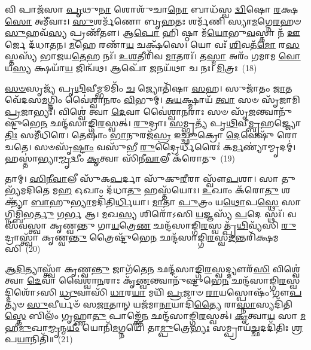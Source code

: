 {\anuvakamend[{\-\ul{𑌸𑍁}\-\-\ul{𑌶}\-𑌸𑍍𑌤𑌿𑌭𑌿𑌃᳴ \ul{𑌶𑌿}\-𑌵𑍋 𑌭᳴𑌵 𑌯𑌾\-\ul{𑌹𑌿} 𑌷𑌟𑍍𑌤𑍍𑌰𑌿𑍞᳴𑌶𑌚𑍍𑌚}]}%

𑌵𑌿 𑌪𑌾𑌜᳴𑌸𑌾 \ul{𑌪𑍃}\-𑌥𑍁\-\ul{𑌨𑌾} 𑌶𑍋𑌶𑍁᳴𑌚𑌾\-\ul{𑌨𑍋} 𑌬𑌾𑌧᳴𑌸𑍍𑌵 \ul{𑌦𑍍𑌵𑌿}\-𑌷𑍋 \ul{𑌰}\-𑌕𑍍𑌷\-\ul{𑌸𑍋} 𑌅𑌮𑍀᳴𑌵𑌾𑌃। \ul{𑌸𑍁}\-𑌶𑌰𑍍𑌮᳴𑌣𑍋 𑌬𑍃\-\ul{𑌹}\-𑌤𑌃 𑌶𑌰𑍍𑌮᳴𑌣𑌿 𑌸𑍍𑌯𑌾\-\ul{𑌮}\-𑌗𑍍𑌨𑍇\-\ul{𑌰}\-𑌹𑍞 \ul{𑌸𑍁}\-𑌹𑌵᳴\-\ul{𑌸𑍍𑌯} 𑌪𑍍𑌰𑌣𑍀᳴𑌤𑍗। 𑌆\-\ul{𑌪𑍋} 𑌹𑌿 𑌷𑍍𑌠𑌾 𑌮᳴\-\ul{𑌯𑍋}\-𑌭𑍁\-\ul{𑌵}\-𑌸𑍍𑌤𑌾 𑌨᳴ \ul{𑌊}\-𑌰𑍍𑌜𑍇 𑌦᳴𑌧𑌾𑌤𑌨। \ul{𑌮}\-𑌹𑍇 𑌰𑌣𑌾᳴\-\ul{𑌯} 𑌚𑌕𑍍𑌷᳴𑌸𑍇। 𑌯𑍋 𑌵𑌃᳴ \ul{𑌶𑌿}\-𑌵𑌤᳴\-\ul{𑌮𑍋} 𑌰\-\ul{𑌸}\-𑌸𑍍𑌤𑌸𑍍𑌯᳴ 𑌭𑌾𑌜𑌯\-\ul{𑌤𑍇}\-𑌹 𑌨𑌃᳴। \ul{𑌉}\-\-\ul{𑌶}\-𑌤𑍀𑌰𑌿᳴𑌵 \ul{𑌮𑌾}\-𑌤𑌰𑌃᳴। 𑌤\-\ul{𑌸𑍍𑌮𑌾} 𑌅𑌰𑌂᳴ 𑌗𑌮𑌾𑌮 \ul{𑌵𑍋} 𑌯\-\ul{𑌸𑍍𑌯} 𑌕𑍍𑌷𑌯𑌾᳴\-\ul{𑌯} 𑌜𑌿𑌨𑍍𑌵᳴𑌥। 𑌆𑌪𑍋᳴ \ul{𑌜}\-𑌨𑌯᳴𑌥𑌾 𑌚 𑌨𑌃। \ul{𑌮𑌿}\-𑌤𑍍𑌰𑌃~(18)

\-\ul{𑌸}\-\-\ul{𑍞}\-𑌸𑍃𑌜𑍍𑌯᳴ 𑌪𑍃\-\ul{𑌥𑌿}\-𑌵𑍀𑌮𑍍𑌭𑍂𑌮𑌿𑌂᳴ \ul{𑌚} 𑌜𑍍𑌯𑍋𑌤𑌿᳴𑌷𑌾 \ul{𑌸}\-𑌹। 𑌸𑍁𑌜𑌾᳴𑌤𑌂 \ul{𑌜𑌾}\-𑌤𑌵𑍇᳴𑌦𑌸\-\ul{𑌮}\-𑌗𑍍𑌨𑌿𑌂 𑌵𑍈॑𑌶𑍍𑌵𑌾\-\ul{𑌨}\-𑌰𑌂 \ul{𑌵𑌿}\-𑌭𑍁𑌮𑍍। \ul{𑌅}\-\-\ul{𑌯}\-𑌕𑍍𑌷𑍍𑌮𑌾𑌯᳴ \ul{𑌤𑍍𑌵𑌾} 𑌸𑍞 𑌸𑍃᳴𑌜𑌾𑌮𑌿 \ul{𑌪𑍍𑌰}\-𑌜𑌾𑌭𑍍𑌯𑌃᳴। 𑌵𑌿𑌶𑍍𑌵𑍇॑ 𑌤𑍍𑌵𑌾 \ul{𑌦𑍇}\-𑌵𑌾 𑌵𑍈॑𑌶𑍍𑌵𑌾\-\ul{𑌨}\-𑌰𑌾𑌃 𑌸𑍞 𑌸𑍃᳴\-\ul{𑌜}\-𑌨𑍍𑌤𑍍𑌵𑌾𑌨𑍁᳴𑌷𑍍𑌟𑍁𑌭𑍇\-\ul{𑌨} 𑌛𑌨𑍍𑌦᳴𑌸𑌾𑌙𑍍𑌗𑌿\-\ul{𑌰}\-𑌸𑍍𑌵𑌤𑍍। \ul{𑌰𑍁}\-𑌦𑍍𑌰𑌾𑌃 \ul{𑌸}\-𑌮𑍍𑌭𑍃𑌤𑍍𑌯᳴ 𑌪𑍃\-\ul{𑌥𑌿}\-𑌵𑍀\-\ul{𑌮𑍍𑌬𑍃}\-𑌹𑌜𑍍𑌜𑍍𑌯𑍋\-\ul{𑌤𑌿𑌃} 𑌸𑌮𑍀᳴𑌧𑌿𑌰𑍇। 𑌤𑍇𑌷𑌾𑌂॑ \ul{𑌭𑌾}\-𑌨𑍁𑌰𑌜᳴\-\ul{𑌸𑍍𑌰} 𑌇\-\ul{𑌚𑍍𑌛𑍁}\-𑌕𑍍𑌰𑍋 \ul{𑌦𑍇}\-𑌵𑍇𑌷𑍁᳴ 𑌰𑍋𑌚𑌤𑍇। 𑌸𑍞𑌸𑍃᳴\-\ul{𑌷𑍍𑌟𑌾𑌂} 𑌵𑌸𑍁᳴𑌭𑍀 \ul{𑌰𑍁}\-𑌦𑍍𑌰𑍈𑌰𑍍𑌧𑍀𑌰𑍈𑌃॑ 𑌕\-\ul{𑌰𑍍𑌮}\-𑌣𑍍𑌯𑌾॑𑌮𑍍𑌮𑍃𑌦𑌮𑍍॑। 𑌹𑌸𑍍𑌤𑌾॑𑌭𑍍𑌯𑌾\-\ul{𑌮𑍍𑌮𑍃}\-𑌦𑍍𑌵𑍀𑌂 \ul{𑌕𑍃}\-𑌤𑍍𑌵𑌾 𑌸𑌿᳴𑌨𑍀\-\ul{𑌵𑌾}\-𑌲𑍀 𑌕᳴𑌰𑍋𑌤𑍁~(19)

𑌤𑌾𑌮𑍍। \ul{𑌸𑌿}\-\-\ul{𑌨𑍀}\-\-\ul{𑌵𑌾}\-𑌲𑍀 𑌸𑍁᳴𑌕\-\ul{𑌪}\-𑌰𑍍𑌦𑌾 𑌸𑍁᳴𑌕𑍁\-\ul{𑌰𑍀}\-𑌰𑌾 𑌸𑍍𑌵𑍗᳴\-\ul{𑌪}\-𑌶𑌾। 𑌸𑌾 𑌤𑍁𑌭𑍍𑌯᳴𑌮𑌦𑌿𑌤𑍇 𑌮\-\ul{𑌹} 𑌓𑌖𑌾𑌂 𑌦᳴𑌧𑌾\-\ul{𑌤𑍁} 𑌹𑌸𑍍𑌤᳴𑌯𑍋𑌃। \ul{𑌉}\-𑌖𑌾𑌂 𑌕᳴𑌰𑍋\-\ul{𑌤𑍁} 𑌶𑌕𑍍𑌤𑍍𑌯𑌾᳴ \ul{𑌬𑌾}\-𑌹𑍁\-\ul{𑌭𑍍𑌯𑌾}\-𑌮𑌦𑌿᳴𑌤𑌿\-\ul{𑌰𑍍𑌧𑌿}\-𑌯𑌾। \ul{𑌮𑌾}\-𑌤𑌾 \ul{𑌪𑍁}\-𑌤𑍍𑌰𑌂 𑌯\-\ul{𑌥𑍋}\-𑌪\-\ul{𑌸𑍍𑌥𑍇} 𑌸𑌾𑌗𑍍𑌨𑌿𑌮𑍍𑌬𑌿᳴𑌭\-\ul{𑌰𑍍𑌤𑍁} 𑌗\-\ul{𑌰𑍍𑌭} 𑌆। \ul{𑌮}\-𑌖\-\ul{𑌸𑍍𑌯} 𑌶𑌿𑌰𑍋᳴\-𑌽𑌸𑌿 \ul{𑌯}\-𑌜𑍍𑌞𑌸𑍍𑌯᳴ \ul{𑌪}\-𑌦𑍇 𑌸𑍍𑌥𑌃᳴। 𑌵𑌸᳴𑌵𑌸𑍍𑌤𑍍𑌵𑌾 𑌕𑍃𑌣𑍍𑌵𑌨𑍍𑌤𑍁 𑌗𑌾\-\ul{𑌯}\-𑌤𑍍𑌰𑍇\-\ul{𑌣} 𑌛𑌨𑍍𑌦᳴𑌸𑌾𑌙𑍍𑌗𑌿\-\ul{𑌰}\-𑌸𑍍𑌵𑌤𑍍𑌪𑍃᳴\-\ul{𑌥𑌿}\-𑌵𑍍𑌯᳴𑌸𑌿 \ul{𑌰𑍁}\-𑌦𑍍𑌰𑌾𑌸𑍍𑌤𑍍𑌵𑌾᳴ 𑌕𑍃𑌣𑍍𑌵\-\ul{𑌨𑍍𑌤𑍁} 𑌤𑍍𑌰𑍈𑌷𑍍𑌟𑍁᳴𑌭𑍇\-\ul{𑌨} 𑌛𑌨𑍍𑌦᳴𑌸𑌾𑌙𑍍𑌗𑌿\-\ul{𑌰}\-𑌸𑍍𑌵\-\ul{𑌦}\-𑌨𑍍𑌤𑌰𑌿᳴𑌕𑍍𑌷𑌮𑌸𑌿~(20)

\-\ul{𑌆}\-\-\ul{𑌦𑌿}\-𑌤𑍍𑌯𑌾𑌸𑍍𑌤𑍍𑌵𑌾᳴ 𑌕𑍃𑌣𑍍𑌵\-\ul{𑌨𑍍𑌤𑍁} 𑌜𑌾𑌗᳴𑌤𑍇\-\ul{𑌨} 𑌛𑌨𑍍𑌦᳴𑌸𑌾𑌙𑍍𑌗𑌿\-\ul{𑌰}\-𑌸𑍍𑌵𑌦𑍍𑌦𑍍𑌯𑍗𑌰᳴\-\ul{𑌸𑌿} 𑌵𑌿𑌶𑍍𑌵𑍇॑ 𑌤𑍍𑌵𑌾 \ul{𑌦𑍇}\-𑌵𑌾 𑌵𑍈॑𑌶𑍍𑌵𑌾\-\ul{𑌨}\-𑌰𑌾𑌃 𑌕𑍃᳴\-\ul{𑌣𑍍𑌵}\-𑌨𑍍𑌤𑍍𑌵𑌾𑌨𑍁᳴𑌷𑍍𑌟𑍁𑌭𑍇\-\ul{𑌨} 𑌛𑌨𑍍𑌦᳴𑌸𑌾𑌙𑍍𑌗𑌿\-\ul{𑌰}\-𑌸𑍍𑌵𑌦𑍍𑌦𑌿𑌶𑍋᳴\-𑌽𑌸𑌿 \ul{𑌧𑍍𑌰𑍁}\-𑌵𑌾𑌸𑌿᳴ \ul{𑌧𑌾}\-𑌰\-\ul{𑌯𑌾} 𑌮𑌯𑌿᳴ \ul{𑌪𑍍𑌰}\-𑌜𑌾𑍞 \ul{𑌰𑌾}\-𑌯𑌸𑍍𑌪𑍋𑌷𑌂᳴ 𑌗𑍗\-\ul{𑌪}\-𑌤𑍍𑌯𑍞 \ul{𑌸𑍁}\-𑌵𑍀𑌰𑍍𑌯𑍞᳴ 𑌸\-\ul{𑌜𑌾}\-𑌤𑌾𑌨𑍍 𑌯𑌜᳴𑌮𑌾\-\ul{𑌨𑌾}\-𑌯𑌾𑌦𑌿᳴\-\ul{𑌤𑍍𑌯𑍈} 𑌰𑌾\-\ul{𑌸𑍍𑌨𑌾}\-𑌸𑍍𑌯𑌦𑌿᳴𑌤𑌿\-\ul{𑌸𑍍𑌤𑍇} 𑌬𑌿𑌲𑌂᳴ 𑌗𑍃𑌹𑍍𑌣𑌾\-\ul{𑌤𑍁} 𑌪𑌾𑌙𑍍𑌕𑍍𑌤𑍇᳴\-\ul{𑌨} 𑌛𑌨𑍍𑌦᳴𑌸𑌾𑌙𑍍𑌗𑌿\-\ul{𑌰}\-𑌸𑍍𑌵𑌤𑍍। \ul{𑌕𑍃}\-𑌤𑍍𑌵𑌾\-\ul{𑌯} 𑌸𑌾 \ul{𑌮}\-𑌹𑍀\-\ul{𑌮𑍁}\-𑌖𑌾\-\ul{𑌮𑍍𑌮𑍃}\-𑌨𑍍𑌮\-\ul{𑌯𑍀𑌂} 𑌯𑍋𑌨𑌿᳴\-\ul{𑌮}\-𑌗𑍍𑌨𑌯𑍇॑। 𑌤𑌾\-\ul{𑌮𑍍𑌪𑍁}\-𑌤𑍍𑌰𑍇\-\ul{𑌭𑍍𑌯𑌃} 𑌸𑌮𑍍𑌪𑍍𑌰𑌾𑌯᳴\-\ul{𑌚𑍍𑌛}\-𑌦𑌦𑌿᳴𑌤𑌿𑌃 \ul{𑌶𑍍𑌰}\-𑌪\-\ul{𑌯𑌾}\-𑌨𑌿𑌤𑌿᳴॥~(21)

